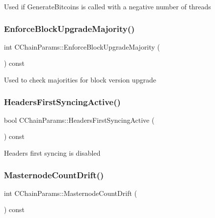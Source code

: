 Used if Generate\+Bitcoins is called with a negative number of threads \mbox{\label{class_c_chain_params_ac55b927a13650f1b6593b0200258ce62}} 
\subsubsection{\texorpdfstring{EnforceBlockUpgradeMajority()}{EnforceBlockUpgradeMajority()}}
{\footnotesize\ttfamily int C\+Chain\+Params\+::\+Enforce\+Block\+Upgrade\+Majority (\begin{DoxyParamCaption}{ }\end{DoxyParamCaption}) const\hspace{0.3cm}{\ttfamily [inline]}}

Used to check majorities for block version upgrade \mbox{\label{class_c_chain_params_ae1bf9eed6ce76328909127bfc9965f76}} 
\subsubsection{\texorpdfstring{HeadersFirstSyncingActive()}{HeadersFirstSyncingActive()}}
{\footnotesize\ttfamily bool C\+Chain\+Params\+::\+Headers\+First\+Syncing\+Active (\begin{DoxyParamCaption}{ }\end{DoxyParamCaption}) const\hspace{0.3cm}{\ttfamily [inline]}}

Headers first syncing is disabled \mbox{\label{class_c_chain_params_a9d2e5ae617867ebcb930c65a146b6e5c}} 
\subsubsection{\texorpdfstring{MasternodeCountDrift()}{MasternodeCountDrift()}}
{\footnotesize\ttfamily int C\+Chain\+Params\+::\+Masternode\+Count\+Drift (\begin{DoxyParamCaption}{ }\end{DoxyParamCaption}) const\hspace{0.3cm}{\ttfamily [inline]}}


